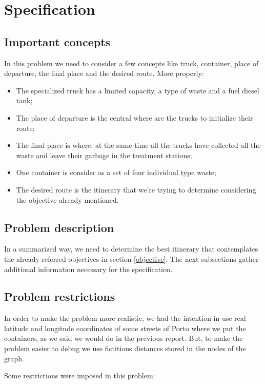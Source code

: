 \documentclass[a4paper]{article}
\begin{document}
\section{Specification}
\subsection{Important concepts}

In this problem we need to consider a few concepts like truck, container, place of departure, the final place and the desired route. More properly:

\begin{itemize}
	\item The specialized truck has a limited capacity, a type of waste and a fuel diesel tank;
	\item The place of departure is the central where are the trucks to initialize their route;
	\item The final place is where, at the same time all the trucks have collected all the waste and leave their garbage in the treatment stations;
	\item One container is consider as a set of four individual type waste;
	\item The desired route is the itinerary that we're trying to determine considering the objective already mentioned. 
\end{itemize}

\subsection{Problem description}

In a summarized way, we need to determine the best itinerary that contemplates the already referred objectives in section \ref{objective}. The next subsections gather additional information necessary for the specification.

\subsection{Problem restrictions}

In order to make the problem more realistic, we had the intention in use real latitude and longitude coordinates of some streets of Porto where we put the containers, as we said we  would do in the previous report. But, to make the problem easier to debug we use fictitious distances stored in the nodes of the graph. 

Some restrictions were imposed in this problem:
\end{document}
